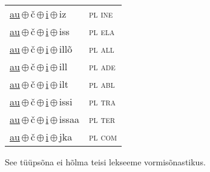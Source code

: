 \begin{minipage}{\textwidth}
\begin{sideways}
\begin{tabular}{l l}
\underline{au}\,$\oplus$\,č\,$\oplus$\,\underline{i}\,$\oplus$\,iz & \textsc{ pl ine } \\
\underline{au}\,$\oplus$\,č\,$\oplus$\,\underline{i}\,$\oplus$\,iss & \textsc{ pl ela } \\
\underline{au}\,$\oplus$\,č\,$\oplus$\,\underline{i}\,$\oplus$\,illõ & \textsc{ pl all } \\
\underline{au}\,$\oplus$\,č\,$\oplus$\,\underline{i}\,$\oplus$\,ill & \textsc{ pl ade } \\
\underline{au}\,$\oplus$\,č\,$\oplus$\,\underline{i}\,$\oplus$\,ilt & \textsc{ pl abl } \\
\underline{au}\,$\oplus$\,č\,$\oplus$\,\underline{i}\,$\oplus$\,issi & \textsc{ pl tra } \\
\underline{au}\,$\oplus$\,č\,$\oplus$\,\underline{i}\,$\oplus$\,issaa & \textsc{ pl ter } \\
\underline{au}\,$\oplus$\,č\,$\oplus$\,\underline{i}\,$\oplus$\,jka & \textsc{ pl com } \\
\end{tabular}
\end{sideways}
\label{tab:tüüpsõnamall-auči}

\end{minipage}

 
\vspace{1em}
\noindent See tüüpsõna ei hõlma teisi lekseeme vormi\-sõnastikus.
